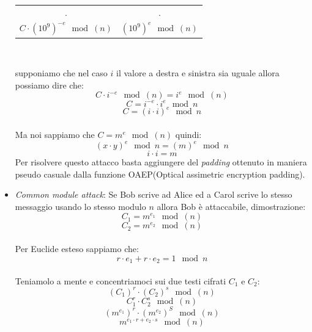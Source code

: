 \documentclass[10pt,a4paper]{article}
\begin{document}
\begin{itemize}
\begin{center}
\begin{tabular}{c|c}
.&.\\
$C\cdot (10^9)^{-e} \mod(n)$& 	$(10^9)^e \mod(n)$ \\
\end{tabular}\\
\end{center}
supponiamo che nel caso $i$ il valore a destra e sinistra sia uguale allora possiamo dire che:
$$ C\cdot i^{-e} \mod(n)=i^e \mod(n)$$
$$ C=i^{-e}\cdot i^e \mod n$$
$$ C=(i\cdot i)^e \mod n$$\\
Ma noi sappiamo che $C=m^e \mod(n)$ quindi:
$$(x\cdot y)^e \mod n = (m)^e \mod n$$
$$ i\cdot i = m$$
Per risolvere questo attacco basta aggiungere del \textit{padding} ottenuto in maniera pseudo casuale dalla funzione OAEP(Optical assimetric encryption padding).
\newpage
\item \textit{Common module attack}: Se Bob scrive ad Alice ed a Carol scrive lo stesso messaggio usando lo stesso modulo $n$ allora Bob è attaccabile, dimostrazione:\\
$$C_1=m^{e_1} \mod(n)$$ $$ C_2=m^{e_2} \mod(n)$$\\
Per Euclide esteso sappiamo che:\\
$$r\cdot e_1+r\cdot e_2 = 1 \mod n$$\\
Teniamolo a mente e concentriamoci sui due testi cifrati $C_1$ e $C_2$:
$$(C_1)^r\cdot(C_2)^s\mod(n)$$
$$C_1^r\cdot C_2^s \mod(n)$$
$$(m^{e_1})^r\cdot (m^{e_2})^S \mod(n)$$
$$m^{e_1\cdot r + e_2\cdot s} \mod(n)$$


\end{itemize}
\end{document}
